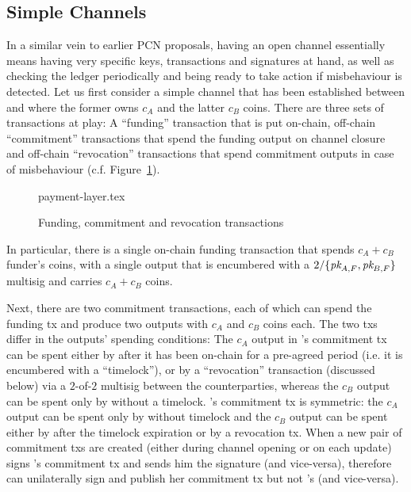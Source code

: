 \subsection{Simple Channels}
  In a similar vein to earlier PCN proposals, having an open channel essentially
  means having very specific keys, transactions and signatures at hand, as well
  as checking the ledger periodically and being ready to take action if
  misbehaviour is detected. Let us first consider a simple channel that has been
  established between \alice and \bob where the former owns $c_A$ and the latter
  $c_B$ coins. There are three sets of transactions at play: A ``funding''
  transaction that is put on-chain, off-chain ``commitment'' transactions that
  spend the funding output on channel closure and off-chain ``revocation''
  transactions that spend commitment outputs in case of misbehaviour (c.f.
  Figure~\ref{figure:payment-layer}).

  \begin{figure}
    {payment-layer.tex}
    \caption{Funding, commitment and revocation transactions}
    \label{figure:payment-layer}
  \end{figure}

  In particular, there is a single on-chain funding transaction that spends $c_A
  + c_B$ funder's coins, with a single output that is encumbered with a
  $2/\{\textit{pk}_{A, F}, \textit{pk}_{B, F}\}$ multisig and carries $c_A + c_B$ coins.

  Next, there are two commitment transactions, each of which can spend the
  funding tx and produce two outputs with $c_A$ and $c_B$ coins each. The two
  txs differ in the outputs' spending conditions: The $c_A$ output in \alice's
  commitment tx can be spent either by \alice after it has been on-chain for a
  pre-agreed period (i.e. it is encumbered with a ``timelock''), or by a
  ``revocation'' transaction (discussed below) via a $2$-of-$2$ multisig between
  the counterparties, whereas the $c_B$ output can be spent only by \bob without
  a timelock. \bob's commitment tx is symmetric: the $c_A$ output can be spent
  only by \alice without timelock and the $c_B$ output can be spent either by
  \bob after the timelock expiration or by a revocation tx. When a new pair of
  commitment txs are created (either during channel opening or on each update)
  \alice signs \bob's commitment tx and sends him the signature (and
  vice-versa), therefore \alice can unilaterally sign and publish her commitment
  tx but not \bob's (and vice-versa).

